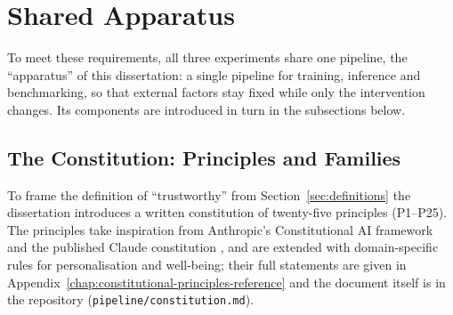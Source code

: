 \section{Shared Apparatus}
\label{sec:mr-shared-apparatus}

To meet these requirements, all three experiments share one pipeline, the ``apparatus'' of this dissertation: a single pipeline for training, inference and benchmarking, so that external factors stay fixed while only the intervention changes. Its components are introduced in turn in the subsections below.

\subsection{The Constitution: Principles and Families}
\label{subsec:mr-constitution}

To frame the definition of ``trustworthy'' from Section~\ref{sec:definitions} the dissertation introduces a written constitution of twenty-five principles (P1--P25). The principles take inspiration from Anthropic's Constitutional AI framework \cite{bai2022constitutionalaiharmlessnessai} and the published Claude constitution \cite{anthropic2023claudesconstitution}, and are extended with domain-specific rules for personalisation and well-being; their full statements are given in Appendix~\ref{chap:constitutional-principles-reference} and the document itself is in the repository (\texttt{pipeline/constitution.md}).

